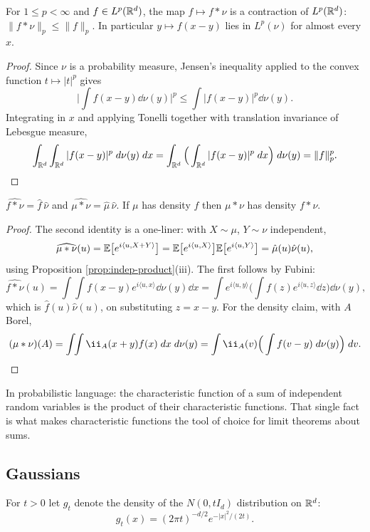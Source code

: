 \documentclass[a4paper]{scrartcl}
\newcommand{\ip}[2]{\langle #1, #2 \rangle}
\newcommand{\ind}{\ii}
\begin{document}
\begin{proposition}\label{prop:conv-contraction}
	For $1\leq p<\infty$ and $f \in L^p(\mathbb{R}^d)$, the map $f \mapsto f*\nu$ is a contraction of $L^p(\mathbb{R}^d)$: $\|f*\nu\|_p \leq \|f\|_p$. In particular $y \mapsto f(x-y)$ lies in $L^p(\nu)$ for almost every $x$.
\end{proposition}
\begin{proof}
	Since $\nu$ is a probability measure, Jensen's inequality applied to the convex function $t\mapsto |t|^p$ gives
	$$
	\Big| \int f(x-y)\dd\nu(y)\Big|^p \leq \int |f(x-y)|^p\dd\nu(y).
	$$
	Integrating in $x$ and applying Tonelli together with translation invariance of Lebesgue measure,
	$$
	\int_{\mathbb{R}^d}\int_{\mathbb{R}^d}|f(x-y)|^p\; d\nu(y)\; d x = \int_{\mathbb{R}^d}\Big(\int_{\mathbb{R}^d}|f(x-y)|^p\; d x\Big)\; d\nu(y) = \|f\|_p^p. \qedhere
	$$
\end{proof}

\begin{proposition}\label{prop:conv-fourier}
	$\widehat{f*\nu} = \hat f\,\hat\nu$ and $\widehat{\mu*\nu}=\hat\mu\,\hat\nu$. If $\mu$ has density $f$ then $\mu*\nu$ has density $f*\nu$.
\end{proposition}
\begin{proof}
	The second identity is a one-liner: with $X\sim\mu$, $Y\sim\nu$ independent,
	$$
	\widehat{\mu*\nu}(u) = \EE\big[e^{i\ip{u}{X+Y}}\big]=\EE\big[e^{i\ip{u}{X}}\big]\EE\big[e^{i\ip{u}{Y}}\big]=\hat\mu(u)\hat\nu(u),
	$$
	using Proposition \ref{prop:indep-product}(iii). The first follows by Fubini:
	$$
	\widehat{f*\nu}(u) = \int\!\!\int f(x-y)e^{i\ip{u}{x}}\dd\nu(y)\dd x = \int e^{i\ip{u}{y}}\Big(\int f(z)e^{i\ip{u}{z}}\dd z\Big)\dd\nu(y),
	$$
	which is $\hat f(u)\hat\nu(u)$, on substituting $z = x-y$. For the density claim, with $A$ Borel,
	$$
	(\mu*\nu)(A) = \int\!\!\int\ind_A(x+y)f(x)\dd x\dd\nu(y) = \int \ind_A(v)\Big(\int f(v-y)\dd\nu(y)\Big)\dd v. \qedhere
	$$
\end{proof}

In probabilistic language: the characteristic function of a sum of independent random variables is the product of their characteristic functions. That single fact is what makes characteristic functions the tool of choice for limit theorems about sums.

\subsection{Gaussians}

\begin{definition}
	For $t>0$ let $g_t$ denote the density of the $N(0,tI_d)$ distribution on $\mathbb{R}^d$:
	$$
	g_t(x) = (2\pi t)^{-d/2}e^{-|x|^2/(2t)}.
	$$
\end{definition}
\end{document}
